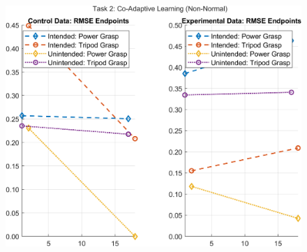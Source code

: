 \documentclass[12pt]{article}
\newcommand\figWidth{7in}
\begin{document}
\begin{figure}
    \includegraphics[width = \figWidth]{t2-spaghetti-xnorm.png}
\end{figure}
\end{document}
